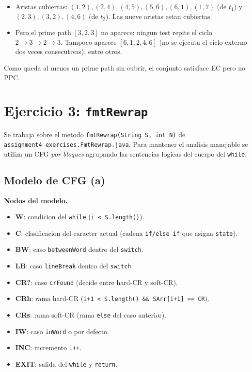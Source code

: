 \documentclass[12pt,a4paper]{article}
\begin{document}
\begin{itemize}
  \item Aristas cubiertas: $(1,2), (2,4), (4,5), (5,6), (6,1), (1,7)$ (de $t_1$) y $(2,3), (3,2),
  (4,6)$ (de $t_2$). Las nueve aristas estan cubiertas.
  \item Pero el prime path $[3, 2, 3]$ no aparece: ningun test repite el ciclo
  $2 \to 3 \to 2 \to 3$. Tampoco aparece $[6, 1, 2, 4, 6]$ (no se ejecuta el ciclo externo dos
  veces consecutivas), entre otros.
\end{itemize}

Como queda al menos un prime path sin cubrir, el conjunto satisface EC pero no PPC.

\section{Ejercicio 3: \texttt{fmtRewrap}}

Se trabaja sobre el metodo \texttt{fmtRewrap(String S, int N)} de
\texttt{assignment4\_exercises.FmtRewrap.java}. Para mantener el analisis manejable se utiliza un
CFG \emph{por bloques} agrupando las sentencias logicas del cuerpo del \texttt{while}.

\subsection{Modelo de CFG (a)}

\textbf{Nodos del modelo.}
\begin{itemize}
  \item \textbf{W}: condicion del \texttt{while} (\texttt{i < S.length()}).
  \item \textbf{C}: clasificacion del caracter actual (cadena \texttt{if/else if} que asigna
  \texttt{state}).
  \item \textbf{BW}: caso \texttt{betweenWord} dentro del \texttt{switch}.
  \item \textbf{LB}: caso \texttt{lineBreak} dentro del \texttt{switch}.
  \item \textbf{CR?}: caso \texttt{crFound} (decide entre hard-CR y soft-CR).
  \item \textbf{CRh}: rama hard-CR (\texttt{i+1 < S.length() \&\& SArr[i+1] == CR}).
  \item \textbf{CRs}: rama soft-CR (rama \texttt{else} del caso anterior).
  \item \textbf{IW}: caso \texttt{inWord} o por defecto.
  \item \textbf{INC}: incremento \texttt{i++}.
  \item \textbf{EXIT}: salida del \texttt{while} y \texttt{return}.
\end{itemize}
\end{document}
